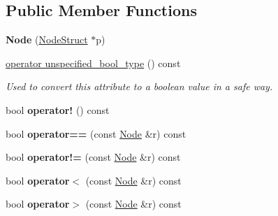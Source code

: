\subsection*{Public Member Functions}
\begin{DoxyCompactItemize}
\item 
\hypertarget{classphys_1_1xml_1_1Node_aaefbe98a05a7bf304612c3e7f7556f42}{
{\bfseries Node} (\hyperlink{structphys_1_1xml_1_1NodeStruct}{NodeStruct} $\ast$p)}
\label{d7/d0a/classphys_1_1xml_1_1Node_aaefbe98a05a7bf304612c3e7f7556f42}

\item 
\hyperlink{classphys_1_1xml_1_1Node_a1a3af56736ef4dd39596bb71607ebbc7}{operator unspecified\_\-bool\_\-type} () const 
\begin{DoxyCompactList}\small\item\em Used to convert this attribute to a boolean value in a safe way. \item\end{DoxyCompactList}\item 
\hypertarget{classphys_1_1xml_1_1Node_a121ff268fa51c4a66ad8d4a6734f4535}{
bool {\bfseries operator!} () const }
\label{d7/d0a/classphys_1_1xml_1_1Node_a121ff268fa51c4a66ad8d4a6734f4535}

\item 
\hypertarget{classphys_1_1xml_1_1Node_aa4008ce4f37c81ffc204198d9a026539}{
bool {\bfseries operator==} (const \hyperlink{classphys_1_1xml_1_1Node}{Node} \&r) const }
\label{d7/d0a/classphys_1_1xml_1_1Node_aa4008ce4f37c81ffc204198d9a026539}

\item 
\hypertarget{classphys_1_1xml_1_1Node_a00077491f468d40745a15963fc8c8bf7}{
bool {\bfseries operator!=} (const \hyperlink{classphys_1_1xml_1_1Node}{Node} \&r) const }
\label{d7/d0a/classphys_1_1xml_1_1Node_a00077491f468d40745a15963fc8c8bf7}

\item 
\hypertarget{classphys_1_1xml_1_1Node_ae60944f0610e55a12d772575a97e0e89}{
bool {\bfseries operator$<$} (const \hyperlink{classphys_1_1xml_1_1Node}{Node} \&r) const }
\label{d7/d0a/classphys_1_1xml_1_1Node_ae60944f0610e55a12d772575a97e0e89}

\item 
\hypertarget{classphys_1_1xml_1_1Node_a394f3b55158abd6716eeb8d7dd966262}{
bool {\bfseries operator$>$} (const \hyperlink{classphys_1_1xml_1_1Node}{Node} \&r) const }
\label{d7/d0a/classphys_1_1xml_1_1Node_a394f3b55158abd6716eeb8d7dd966262}


\end{DoxyCompactItemize}
